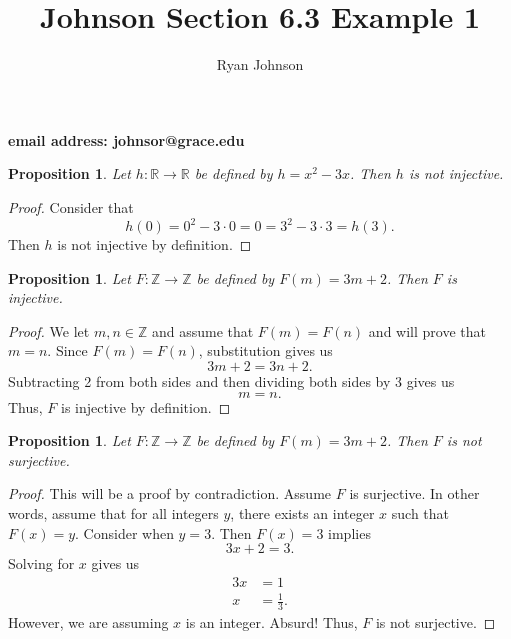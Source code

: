 \documentclass[12pt]{article}
\title{Johnson Section 6.3 Example 1}
\author{Ryan Johnson}
\theoremstyle{plain}
\newtheorem{proposition}[theorem]{Proposition}
\begin{document}
\maketitle

\begin{center}
\textbf{email address: johnsor@grace.edu}
\end{center}

\begin{proposition}
Let $h : \mathbb{R} \to \mathbb{R}$ be defined by $h = x^2 - 3x$.  Then $h$ is not injective.
\end{proposition}

\begin{proof}
Consider that
\[
h(0) = 0^2 - 3\cdot 0 = 0 = 3^2 - 3\cdot 3 = h(3).
\]
Then $h$ is not injective by definition.
\end{proof}

\begin{proposition}
Let $F : \mathbb{Z} \to \mathbb{Z}$ be defined by $F(m) = 3m+2$.  Then $F$ is injective.
\end{proposition}

\begin{proof}
We let $m, n \in \mathbb{Z}$ and assume that $F(m) = F(n)$ and will prove that $m=n$.  Since $F(m) = F(n)$, substitution gives us
\[
3m+2 = 3n +2.
\]
Subtracting 2 from both sides and then dividing both sides by 3 gives us
\[
m=n.
\]
Thus, $F$ is injective by definition.
\end{proof}

\newpage

\begin{proposition}
Let $F : \mathbb{Z} \to \mathbb{Z}$ be defined by $F(m) = 3m + 2$.  Then $F$ is not surjective.
\end{proposition}

\begin{proof}
This will be a proof by contradiction.  Assume $F$ is surjective.  In other words, assume that for all integers $y$, there exists an integer $x$ such that $F(x) = y$.  Consider when $y = 3$.  Then $F(x) = 3$ implies
\[
3x + 2 = 3.
\]
Solving for $x$ gives us
\begin{align*}
    3x &= 1\\
    x &= \frac{1}{3}.
\end{align*}
However, we are assuming $x$ is an integer.  Absurd!  Thus, $F$ is not surjective.
\end{proof}
\end{document}
